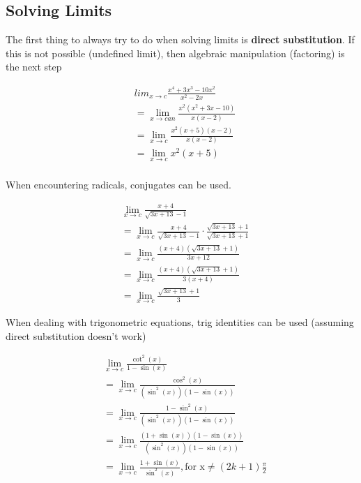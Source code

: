 \documentclass[12pt]{article}
\begin{document}
    \subsection{Solving Limits}

        The first thing to always try to do when solving limits is \textbf{direct substitution}. If this
        is not possible (undefined limit), then algebraic manipulation (factoring) is the next step

        \[
            \begin{aligned}
                & lim_{x \to c} \frac{x^4 + 3x^3 - 10x^2}{x^2 - 2x} \\
                &= \lim_{x \to can} \frac{x^2(x^2 + 3x - 10)}{x(x - 2)} \\
                &= \lim_{x \to c} \frac{x^2(x+5)(x-2)}{x(x-2)}\\
                &= \lim_{x \to c} x^2(x+5)\\
            \end{aligned}    
        \]

        When encountering radicals, conjugates can be used.

        \[
            \begin{aligned}
                & \lim_{x \to c} \frac{x + 4}{\sqrt{3x + 13} - 1} \\
                &= \lim_{x \to c} \frac{x + 4}{\sqrt{3x + 13} - 1} \cdot \frac{\sqrt{3x + 13} + 1}{\sqrt{3x + 13} + 1} \\
                &= \lim_{x \to c} \frac{(x + 4)(\sqrt{3x + 13} + 1)}{3x + 12} \\
                &= \lim_{x \to c} \frac{(x + 4)(\sqrt{3x + 13} + 1)}{3(x + 4)} \\
                &= \lim_{x \to c} \frac{\sqrt{3x + 13} + 1}{3}
            \end{aligned}    
        \]

        When dealing with trigonometric equations, trig identities can be used
        (assuming direct substitution doesn't work)

        \[
            \begin{aligned}
                &\lim_{x \to c} \frac{\cot^2(x)}{1 - \sin(x)} \\
                &= \lim_{x \to c} \frac{\cos^2(x)}{(\sin^2(x))(1 - \sin(x))} \\
                &= \lim_{x \to c} \frac{1 - \sin^2(x)}{(\sin^2(x))(1 - \sin(x))} \\
                &= \lim_{x \to c} \frac{(1 + \sin(x))(1 - \sin(x))}{(\sin^2(x))(1 - \sin(x))} \\
                &= \lim_{x \to c} \frac{1 + \sin(x)}{\sin^2(x)}, \text{for x} \ne (2k + 1)\frac{\pi}{2}
            \end{aligned}    
        \]
\end{document}
